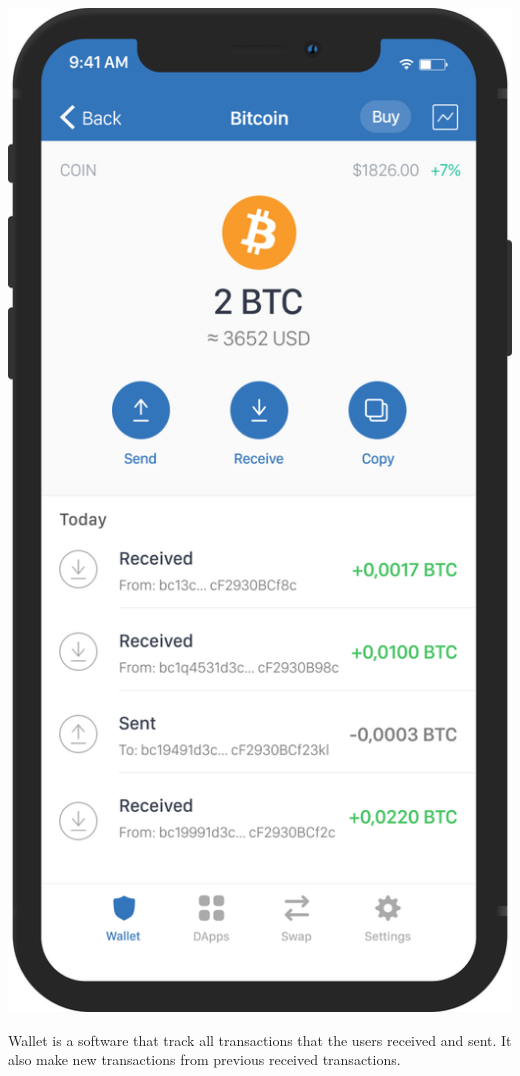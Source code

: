 \documentclass[12pt]{article}
\begin{document}
\includegraphics[width=\columnwidth/2]{imgs/wallet.png}

Wallet is a software that track all transactions that the users received and sent.
It also make new transactions from previous received transactions.
\end{document}
